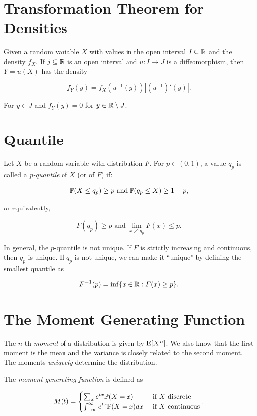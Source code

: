 \section{Transformation Theorem for Densities}

Given a random variable \(X\) with values in the open interval \(I \subseteq \mathbb{R}\) and the density \(f_X\). If 
\(j \subseteq \mathbb{R}\) is an open interval and \(u: I \to J\) is a diffeomorphism, then \(Y = u(X)\) has the density 

\[
    f_Y (y) = f_X(u^{-1}(y)) | (u^{-1})'(y)|.
\]

For \(y \in J\) and \(f_Y(y) = 0\) for \(y \in \mathbb{R} \setminus J\).

\section{Quantile}

Let \( X \) be a random variable with distribution \( F \).
For \( p \in (0, 1) \), a value \( q_p \) is called a \emph{p-quantile} of \( X \) (or of \( F \)) if:

\[
    \mathbb{P}(X \le q_p) \ge p \text{ and }\mathbb{P}(q_p \le X) \ge 1 - p,
\]

or equivalently,

\[
    F(q_p) \ge p \text{ and } \lim_{x \nearrow q_p} F(x) \le p.
\]

In general, the \( p \)-quantile is not unique.
If \( F \) is strictly increasing and continuous, then \( q_p \) is unique.
If \( q_p \) is not unique, we can make it “unique” by defining the smallest quantile as

\[
    F^{-1}(p) = \inf \{ x \in \mathbb{R} : F(x) \ge p \}.
\]

\section{The Moment Generating Function}

The \(n\)-th \emph{moment} of a distribution is given by \(\mathrm{E}[X^n]\). We also 
know that the first moment is the mean and the variance is closely related to the second moment.
The moments \emph{uniquely} determine the distribution.

The \emph{moment generating function} is defined as 

\[
    M(t) = 
    \begin{cases}
        \sum_{x} e^{tx} \mathbb{P}(X = x) & \text{ if } X \text{ discrete} \\
        \int_{-\infty}^{\infty} e^{tx} \mathbb{P}(X = x) dx & \text{ if } X \text{ continuous}
    \end{cases}.
\]

